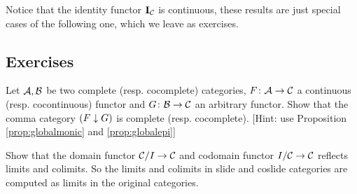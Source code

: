 Notice that the identity functor $\operatorname{\mathbf{I}}_{{\cal C}}$ is continuous, these results are just special cases of the following one, which we leave as exercises.
\subsection{Exercises}
  \begin{ex}
    Let ${\cal A},{\cal B}$ be two complete (resp. cocomplete) categories, $F\colon{\cal A}\to{\cal C}$ a continuous (resp. cocontinuous)  functor and $G\colon{\cal B}\to{\cal C}$ an arbitrary functor. Show that the comma category $(F \downarrow G)$ is complete (resp. cocomplete). [Hint: use Proposition \ref{prop:globalmonic} and \ref{prop:globalepi}]
  \end{ex}
  \begin{ex}
    Show that the domain functor ${\cal C}/I\to{\cal C}$ and codomain functor $I/{\cal C}\to{\cal C}$ reflects limits and colimits. So the limits and colimits in slide and coslide categories are computed as limits in the original categories.
  \end{ex}
